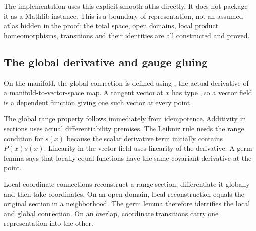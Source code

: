 

The implementation uses this explicit smooth atlas directly. It does not package it as a Mathlib  instance. This is a boundary of representation, not an assumed atlas hidden in the proof: the total space, open domains, local product homeomorphisms, transitions and their identities are all constructed and proved.

\subsection{The global derivative and gauge gluing}
On the manifold, the global connection is defined using , the actual derivative of a manifold-to-vector-space map. A tangent vector at $x$ has type , so a vector field is a dependent function giving one such vector at every point.


The global range property follows immediately from idempotence. Additivity in sections uses actual differentiability premises. The Leibniz rule needs the range condition for $s(x)$ because the scalar derivative term initially contains $P(x)s(x)$. Linearity in the vector field uses linearity of the derivative. A germ lemma says that locally equal functions have the same covariant derivative at the point.

Local coordinate connections reconstruct a range section, differentiate it globally and then take coordinates. On an open domain, local reconstruction equals the original section in a neighborhood. The germ lemma therefore identifies the local and global connection. On an overlap, coordinate transitions carry one representation into the other.


